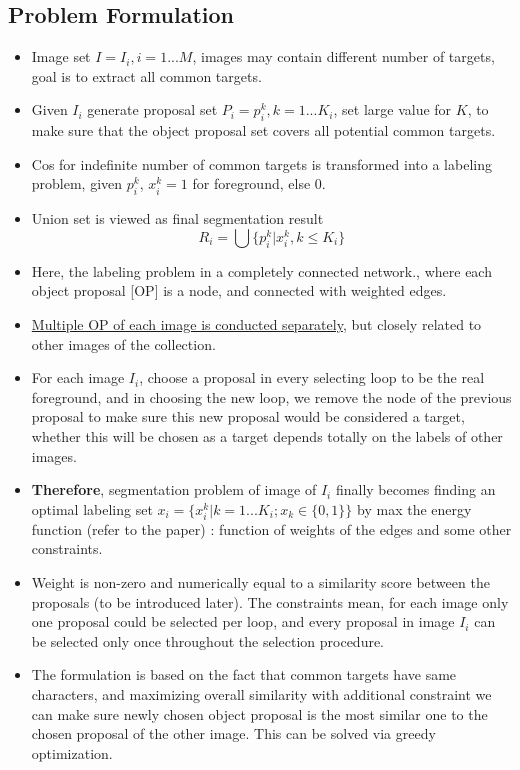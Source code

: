 \documentclass{article}
\begin{document}
\subsection{Problem Formulation}
\begin{itemize}
\item Image set $I = {I_i}, i = {1...M}$, images may contain different number of targets, goal is to extract all common targets.
\item Given $I_i$ generate proposal set $P_i = {p_i^k}, k = {1...K_i}$, set large value for $K$, to make sure that the object proposal set covers all potential common targets.
\item Cos for indefinite number of common targets is transformed into a labeling problem, given $p_i^k$, $x_i^k = 1$ for foreground, else $0$.
\item Union set is viewed as final segmentation result $$R_i = \bigcup \{p_i^k | x_i^k, k \le K_i\}$$
\item Here, the labeling problem in a completely connected network., where each object proposal [OP] is a node, and connected with weighted edges.
\item \underline{Multiple OP of each image is conducted separately}, but closely related to other images of the collection.
\item For each image $I_i$, choose a proposal in every selecting loop to be the real foreground, and in choosing the new loop, we remove the node of the previous proposal to make sure this new proposal would be considered a target, whether this will be chosen as a target depends totally on the labels of other images.
\item \textbf{Therefore}, segmentation problem of image of $I_i$ finally becomes finding an optimal labeling set $x_i = \{x_i^k|k = 1...K_i; x_k \in \{0,1\}\}$ by max the energy function (refer to the paper) : function of weights of the edges and some other constraints.
\item Weight is non-zero and numerically equal to a similarity score between the proposals (to be introduced later). The constraints mean, for each image only one proposal could be selected per loop, and every proposal in image $I_i$ can be selected only once throughout the selection procedure.
\item The formulation is based on the fact that common targets have same characters, and maximizing overall similarity with additional constraint we can make sure newly chosen object proposal is the most similar one to the chosen proposal of the other image. This can be solved via greedy optimization.
\end{itemize}
\end{document}
